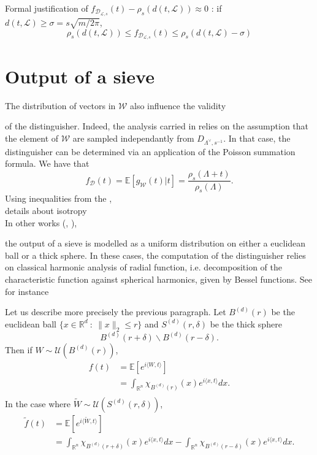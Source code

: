\documentclass{article}
\newif\ifshowcomments
\DeclareRobustCommand{\TN}[1]{%
  \ifshowcomments
    {\color{orange} [TN][#1]}%
  \fi
}
\newcommand{\D}{\mathcal{D}}
\newcommand{\LL}{\mathcal{L}}
\begin{document}
Formal justification of $f_{\D_{\LL ,s}}(t) - \rho_s(d(t,\LL)) \approx 0$ : if $d(t,\LL)\geq \sigma = s\sqrt{m/2\pi}$,
\[\rho_s(d(t,\LL)) \leq f_{\D_{\LL ,s}}(t) \leq \rho_s(d(t,\LL) - \sigma) \]
\section{Output of a sieve}  %
\label{section : Sieve}		%

The distribution of vectors in $\mathcal{W}$ also influence the validity \TN{efficiency ?} of the distinguisher. Indeed, the analysis carried in \cite{pouly2023provable} relies on the assumption that the element of $\mathcal{W}$ are sampled independantly from $D_{\Lambda^\vee ,s^{-1}}$. In that case, the distinguisher can be determined via an application of the Poisson summation formula. We have that 
\[f_\D(t) = \mathbb E[g_\mathcal{W}(t)|t ] = \frac{\rho_s(\Lambda + t)}{\rho_s(\Lambda)}.\] 
Using inequalities from the ,\\

details about isotropy \\

In other works (\cite{carrier2024reduction}, \cite{ducas2023accurate}), \TN{Il faut dire que $\mathcal{W}$ est pris comme la sortie d'un sieve.} the output of a sieve is modelled as a uniform distribution on either a euclidean ball or a thick sphere. In these cases, the computation of the distinguisher relies on classical harmonic analysis of radial function, i.e. decomposition of the characteristic function against spherical harmonics, given by Bessel functions. See for instance %

Let us describe more precisely the previous paragraph. Let $B^{(d)}(r)$ be the euclidean ball $\{x\in\mathbb R^d \ : \  \|x\|_2\leq r\}$ and $S^{(d)}(r,\delta)$ be the thick sphere 
\[ B^{(d)}(r+\delta) \backslash B^{(d)}(r-\delta).\] 
Then if $W\sim\mathcal U(B^{(d)}(r))$,
\[\begin{split}
f(t) & = \mathbb E[e^{i\langle W, t\rangle}] \\
	& = \int_{\mathbb R^n} \chi_{B^{(d)}(r)}(x) e^{i\langle x, t\rangle}dx . \\
\end{split}\]
In the case where $\tilde W\sim\mathcal U(S^{(d)}(r,\delta))$, 
\[\begin{split}
\tilde f(t)  & = \mathbb E[e^{i\langle \tilde W, t\rangle}]\\
	& =  \int_{\mathbb R^n} \chi_{B^{(d)}(r+\delta)}(x) e^{i\langle x, t\rangle}dx - \int_{\mathbb R^n} \chi_{B^{(d)}(r-\delta)}(x) e^{i\langle x, t\rangle}dx. \\
\end{split}\]
\end{document}
